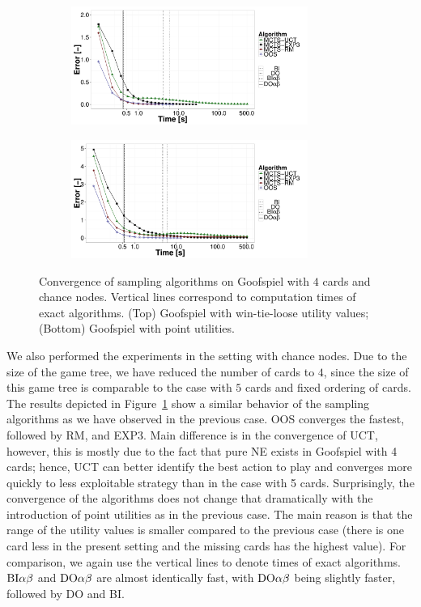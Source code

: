 \begin{figure}[t]
	\begin{subfigure}{1\textwidth}
		\centering
		\includegraphics[width=0.85\textwidth]{figures/convergence-gs-tn.pdf}%
	\end{subfigure}
	\begin{subfigure}{1\textwidth}
		\centering
		\includegraphics[width=0.85\textwidth]{figures/convergence-gs-fn.pdf}%
	\end{subfigure}
\caption{Convergence of sampling algorithms on Goofspiel with $4$ cards and chance nodes.
Vertical lines correspond to computation times of exact algorithms.
(Top) Goofspiel with win-tie-loose utility values;
(Bottom) Goofspiel with point utilities.} \label{fig:off:conv:gsn}
\end{figure}

We also performed the experiments in the setting with chance nodes.
Due to the size of the game tree, we have reduced the number of cards to $4$, since the size of this game tree is comparable to the case with $5$ cards and fixed ordering of cards.
The results depicted in Figure~\ref{fig:off:conv:gsn} show a similar behavior of the sampling algorithms as we have observed in the previous case.
OOS converges the fastest, followed by RM, and EXP3.
Main difference is in the convergence of UCT, however, this is mostly due to the fact that pure NE exists in Goofspiel with 4 cards; hence, UCT can better identify the best action to play and converges more quickly to less exploitable strategy than in the case with 5 cards.
Surprisingly, the convergence of the algorithms does not change that dramatically with the introduction of point utilities as in the previous case.
The main reason is that the range of the utility values is smaller compared to the previous case (there is one card less in the present setting and the missing cards has the highest value).
For comparison, we again use the vertical lines to denote times of exact algorithms.
$\textrm{BI}\alpha\beta$ and $\textrm{DO}\alpha\beta$ are almost identically fast, with $\textrm{DO}\alpha\beta$ being slightly faster, followed by \textsc{DO} and \textsc{BI}.



